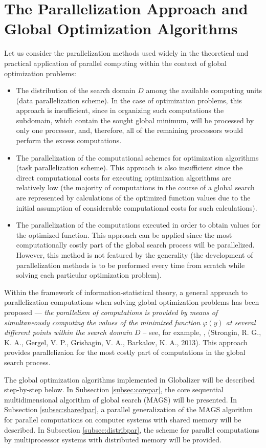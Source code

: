 \documentclass{gOMS2e}
\theoremstyle{plain}%
\theoremstyle{definition}
\theoremstyle{remark}
\begin{document}
\section{The Parallelization Approach and Global Optimization Algorithms}
\label{sec:parallel}
Let us consider the parallelization methods used widely in the theoretical and
practical application of parallel computing within the context of global optimization problems:
\begin{itemize}
  \item The distribution of the search domain \(D\) among the available computing units
  (data parallelization scheme). In the case of optimization problems, this approach is
  insufficient, since in organizing such computations the subdomain, which contain the
  sought global minimum, will be processed by only one processor, and, therefore,
  all of the remaining processors would perform the excess computations.
  \item The parallelization of the computational schemes for optimization algorithms
  (task parallelization scheme). This approach is also insufficient since the direct
  computational costs for executing optimization algorithms are relatively low
  (the majority of computations in the course of a global search are represented by
  calculations of the optimized function values due to the initial assumption of
  considerable computational costs for such calculations).
  \item The parallelization of the computations executed in order to obtain values
  for the optimized function. This approach can be applied since the most computationally
  costly part of the global search process will be parallelized. However, this method is not
  featured by the generality (the development of parallelization methods is to be performed
  every time from scratch while solving each particular optimization problem).
\end{itemize}
\par
Within the framework of information-statistical theory, a general approach to
parallelization computations when solving global optimization problems has been
proposed --- \textit{the parallelism of computations is provided by means of simultaneously
computing the values of the minimized function \(\varphi(y)\) at several different
points within the search domain \(D\)} – see, for example, \cite{strSergGO}, (Strongin, R. G., K. A., Gergel, V. P., Grishagin, V. A., Barkalov, K. A.,  2013).
This approach provides parallelizaion for the most costly part of computations in the global search process.
\par
The global optimization algorithms implemented in Globalizer will be described step-by-step below.
In Subsection \ref{subsec:corepar}, the core sequential multidimensional algorithm of global search (MAGS) will be presented.
In Subsection \ref{subsec:sharedpar}, a parallel generalization of the MAGS algorithm for parallel computations on
computer systems with shared memory will be described. In Subsection \ref{subsec:distribpar}, the scheme
for parallel computations by multiprocessor systems with distributed memory will be provided.
\end{document}
